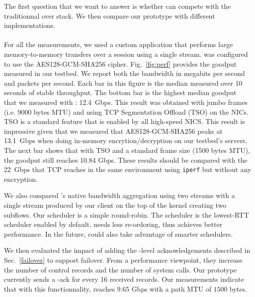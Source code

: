 The first question that we want to answer is whether \tcpls can compete with the
traditionnal \tls over \tcp stack. We then compare our \tcpls prototype with
different \quic implementations.


\paragraph*{\tcpls}
For all the \tcpls measurements, we used a custom application that performs
large memory-to-memory transfers over a \tcpls session using a single stream.
\tcpls was configured to use the AES128-GCM-SHA256 cipher.
Fig.~\ref{fig:perf} provides the goodput measured in our
testbed. We report both the bandwidth in megabits per second and packets per
second. Each bar in this figure is the median measured over 10 seconds of stable
throughput. The bottom bar is the highest median goodput that we measured with \tcpls:
12.4~Gbps. This result was obtained with jumbo frames (i.e. 9000 bytes MTU)
and using TCP Segmentation Offload (TSO) on the NICs. TSO is a standard feature
that is enabled by all high-speed NICS. This result is impressive given that
we measured that
AES128-GCM-SHA256 peaks at 13.1~Gbps when doing in-memory encrytion/decryption on our
testbed's servers. 
The next bar shows that with TSO and a
standard frame size (1500 bytes MTU), the goodput still reaches 10.84 Gbps. These
results should be compared with the 22~Gbps that TCP reaches in the same
environment using \texttt{iperf} but without any encryption. 


We also compared \tcpls's native bandwidth aggregation using two streams with a single stream
produced by our \tcpls client on the top of the \mptcp kernel creating two
\mptcp subflows. Our \tcpls scheduler is a simple round-robin. The \mptcp
scheduler is the lowest-RTT scheduler enabled by default. \mptcp needs less
re-ordoring, thus achieves better performance. In the future, \tcpls could also
take advantage of smarter schedulers.

We then evaluated the impact of adding the \tcpls-level acknowledgements
described in Sec.~\ref{failover} to support failover.
From a performance viewpoint, they increase the number of control records and
the number of system calls. Our prototype currently sends a \tcpls-ack for every
16 received records. Our measurements indicate that with this functionnality,
\tcpls reaches 9.65 Gbps with a path MTU of $1500$ bytes.


